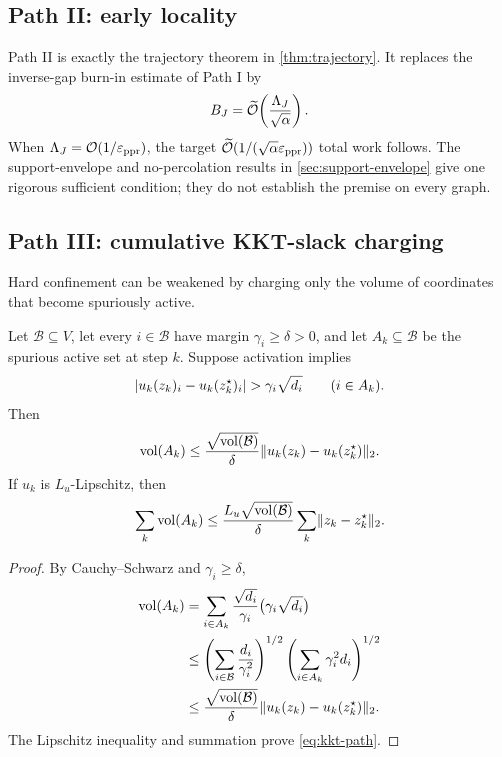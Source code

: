 \subsection{Path II: early locality}

Path II is exactly the trajectory theorem in \cref{thm:trajectory}.  It
replaces the inverse-gap burn-in estimate of Path I by
\[
  B_J=\widetilde{\mathcal{O}}\!\left(\frac{\Lambda_J}{\sqrt\alpha}\right).
\]
When $\Lambda_J=\mathcal{O}(1/\varepsilon_{\mathrm{ppr}})$, the target
$\widetilde{\mathcal{O}}(1/(\sqrt\alpha\varepsilon_{\mathrm{ppr}}))$ total work follows.  The support-envelope and
no-percolation results in \cref{sec:support-envelope} give one rigorous
sufficient condition; they do not establish the premise on every graph.

\subsection{Path III: cumulative KKT-slack charging}

Hard confinement can be weakened by charging only the volume of coordinates
that become spuriously active.

\begin{lemma}
\label{lem:kkt-charge}
Let $\mathcal B\subseteq V$, let every $i\in\mathcal B$ have margin
$\gamma_i\geq\delta>0$, and let $A_k\subseteq\mathcal B$ be the spurious
active set at step $k$.  Suppose activation implies
\[
  \left\lvert u_k(z_k)_i-u_k(z_k^\star)_i \right\rvert
  >\gamma_i\sqrt{d_i}
  \qquad(i\in A_k).
\]
Then
\begin{equation}
  \operatorname{vol}(A_k)
  \leq
  \frac{\sqrt{\operatorname{vol}(\mathcal B)}}{\delta}
  \lVert u_k(z_k)-u_k(z_k^\star)\rVert_2.
  \label{eq:kkt-charge}
\end{equation}
If $u_k$ is $L_u$-Lipschitz, then
\begin{equation}
  \sum_k\operatorname{vol}(A_k)
  \leq
  \frac{L_u\sqrt{\operatorname{vol}(\mathcal B)}}{\delta}
  \sum_k\lVert z_k-z_k^\star\rVert_2.
  \label{eq:kkt-path}
\end{equation}
\end{lemma}

\begin{proof}
By Cauchy--Schwarz and $\gamma_i\geq\delta$,
\[
\begin{split}
  \operatorname{vol}(A_k)
  &=\sum_{i\in A_k}
    \frac{\sqrt{d_i}}{\gamma_i}
    \bigl(\gamma_i\sqrt{d_i}\bigr)\\
  &\leq
    \left(\sum_{i\in\mathcal B}\frac{d_i}{\gamma_i^2}\right)^{1/2}
    \left(\sum_{i\in A_k}\gamma_i^2d_i\right)^{1/2}\\
  &\leq
    \frac{\sqrt{\operatorname{vol}(\mathcal B)}}{\delta}
    \lVert u_k(z_k)-u_k(z_k^\star)\rVert_2.
\end{split}
\]
The Lipschitz inequality and summation prove \cref{eq:kkt-path}.
\end{proof}

